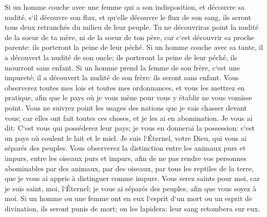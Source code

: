 \verse Si un homme couche avec une femme qui a son indisposition, et découvre sa nudité, s`il découvre son flux, et qu`elle découvre le flux de son sang, ils seront tous deux retranchés du milieu de leur peuple. 
\verse Tu ne découvriras point la nudité de la soeur de ta mère, ni de la soeur de ton père, car c`est découvrir sa proche parente: ils porteront la peine de leur péché. 
\verse Si un homme couche avec sa tante, il a découvert la nudité de son oncle; ils porteront la peine de leur péché, ils mourront sans enfant. 
\verse Si un homme prend la femme de son frère, c`est une impureté; il a découvert la nudité de son frère: ils seront sans enfant. 
\verse Vous observerez toutes mes lois et toutes mes ordonnances, et vous les mettrez en pratique, afin que le pays où je vous mène pour vous y établir ne vous vomisse point. 
\verse Vous ne suivrez point les usages des nations que je vais chasser devant vous; car elles ont fait toutes ces choses, et je les ai en abomination. 
\verse Je vous ai dit: C`est vous qui posséderez leur pays; je vous en donnerai la possession: c`est un pays où coulent le lait et le miel. Je suis l`Éternel, votre Dieu, qui vous ai séparés des peuples. 
\verse Vous observerez la distinction entre les animaux purs et impurs, entre les oiseaux purs et impurs, afin de ne pas rendre vos personnes abominables par des animaux, par des oiseaux, par tous les reptiles de la terre, que je vous ai appris à distinguer comme impurs. 
\verse Vous serez saints pour moi, car je suis saint, moi, l`Éternel; je vous ai séparés des peuples, afin que vous soyez à moi. 
\verse Si un homme ou une femme ont en eux l`esprit d`un mort ou un esprit de divination, ils seront punis de mort; on les lapidera: leur sang retombera sur eux. 

